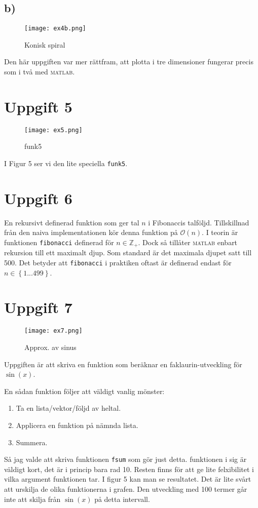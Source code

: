 \documentclass[a4paper,11pt]{article}
\begin{document}
    \subsection*{b)}
    \begin{figure}
        \texttt{[image: ex4b.png]}
        \caption{Konisk spiral}
    \end{figure}
    Den här uppgiften var mer rättfram, att plotta i tre dimensioner fungerar
    precis som i två med \textsc{matlab}.

    \section*{Uppgift 5}
    \begin{figure}
        \texttt{[image: ex5.png]}
        \caption{funk5}
    \end{figure}
    I Figur 5 ser vi den lite speciella \verb+funk5+.

    \section*{Uppgift 6}
    En rekursivt definerad funktion som ger tal $n$ i Fibonaccis talföljd.
    Tillskillnad från den naiva implementationen kör denna funktion på
    $\mathcal{O}(n)$.
    I teorin är funktionen \verb+fibonacci+ definerad för $n \in \mathbb{Z}_+ $.
    Dock så tillåter \textsc{matlab} enbart rekursion till ett maximalt djup.
    Som standard är det maximala djupet satt till 500.
    Det betyder att \verb+fibonacci+ i praktiken oftast är definerad endast för
    $n \in \left\{ 1...499 \right\}$.

    \section*{Uppgift 7}
    \begin{figure}
        \texttt{[image: ex7.png]}
        \caption{Approx. av sinus}
    \end{figure}
    Uppgiften är att skriva en funktion som beräknar en faklaurin-utveckling för
    $\sin (x)$.


    En sådan funktion följer att väldigt vanlig mönster:
    \begin{enumerate}
        \item Ta en lista/vektor/följd av heltal.
        \item Applicera en funktion på nämnda lista.
        \item Summera.
    \end{enumerate}
    Så jag valde att skriva funktionen \verb+fsum+ som gör just detta.
    funktionen i sig är väldigt kort, det är i princip bara rad 10. Resten finns
    för att ge lite felxibilitet i vilka argument funktionen tar.
    I figur 5 kan man se resultatet. Det är lite svårt att urskilja de olika
    funktionerna i grafen. Den utveckling med 100 termer går inte att skilja
    från $\sin (x)$ på detta intervall.
\end{document}
